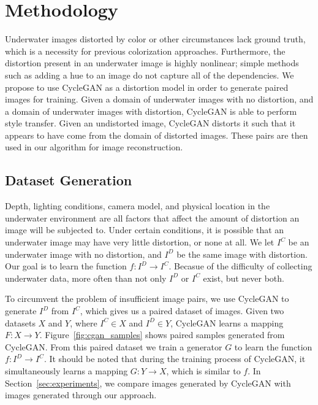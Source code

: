 \section{Methodology}
\label{sec:methodology}
Underwater images distorted by color or other circumstances lack ground truth, which is a necessity for previous colorization
approaches. Furthermore, the distortion present in an underwater image is highly nonlinear; simple methods such as
adding a hue to an image do not capture all of the dependencies. We propose to use CycleGAN as a distortion model in
order to generate paired images for training. Given a domain of underwater images with no distortion, and a domain of
underwater images with distortion, CycleGAN is able to perform style transfer. Given an undistorted image, CycleGAN
distorts it such that it appears to have come from the domain of distorted images. These pairs are then used in our
algorithm for image reconstruction.

\subsection{Dataset Generation}
Depth, lighting conditions, camera model, and physical location in the underwater environment are all factors that affect the 
amount of distortion an image will be subjected to. Under certain conditions, it is possible that an underwater image may have 
very little distortion, or none at all. We let 
$I^C$ be an underwater image with no distortion, and $I^D$ be the same image with distortion. Our goal is to learn the function 
$f: I^D \rightarrow I^C$. Becasue of the difficulty of collecting underwater data, more often than not only $I^D$ or $I^C$ exist, 
but never both.

To circumvent the problem of insufficient image pairs, we use CycleGAN to generate $I^D$ from $I^C$, which gives us a 
paired dataset of images. Given two datasets $X$ and $Y$, where $I^C \in X$ and $I^D \in Y$, CycleGAN learns a mapping $F: X 
\rightarrow Y$. Figure~\ref{fig:cgan_samples} shows paired samples generated from CycleGAN. From this paired dataset we train a 
generator $G$ to learn the function $f: I^D \rightarrow I^C$. It should be noted that during the training process of CycleGAN, 
it simultaneously learns a mapping $G: Y \rightarrow X$, which is similar to $f$. In Section~\ref{sec:experiments}, we compare 
images generated by CycleGAN with images generated through our approach.

